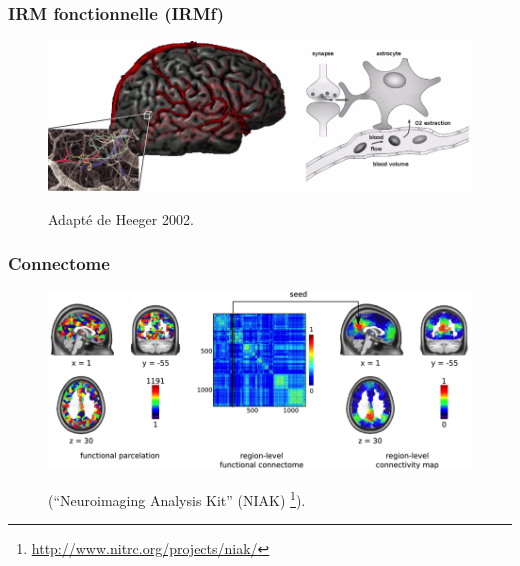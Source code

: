 \documentclass{beamer}
\begin{document}
\begin{frame}
\frametitle{IRM fonctionnelle (IRMf)}
\begin{figure}[H]
\begin{center}
\includegraphics[width=\linewidth]{../figures/bold.png}
\end{center}
\tiny{Adapté de Heeger 2002.}
\end{figure}
\end{frame}


\frame{\sectionpage}

\begin{frame}
\frametitle{Connectome}
\begin{figure}
\begin{center}
\includegraphics[scale=0.8]{../figures/connectome.png}
\end{center}
\tiny{(``Neuroimaging Analysis Kit'' (NIAK) \footnote{\url{http://www.nitrc.org/projects/niak/}}).}
\label{fig_motion_estimation}
\end{figure}
\end{frame}
\end{document}
